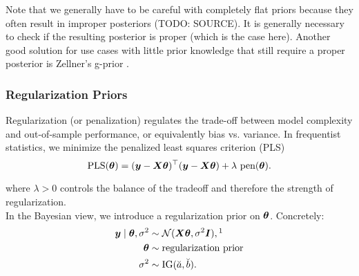 Note that we generally have to be careful with completely flat priors because they often result in improper posteriors (TODO: SOURCE). It is generally necessary to check if the resulting posterior is proper (which is the case here).
Another good solution for use cases with little prior knowledge that still require a proper posterior is Zellner's g-prior \citep{zellner_assessing_1986}.

\subsubsection*{Regularization Priors} \label{sec:lm-regularization}

Regularization (or penalization) regulates the trade-off between model complexity and out-of-sample performance, or equivalently bias vs. variance. 
In frequentist statistics, we minimize the penalized least squares criterion (PLS) 
\begin{equation*}
    \text{PLS}(\btheta) = (\by - \bX \btheta)^\top (\by - \bX \btheta) + \lambda \ \text{pen}(\btheta).
\end{equation*}

where $\lambda > 0$ controls the balance of the tradeoff and therefore the strength of regularization.\\

In the Bayesian view, we introduce a regularization prior on $\bm{\theta}$.
Concretely:
\begin{equation*}
    \begin{aligned}
        \by \mid \btheta, \ssd &\sim \Ncal(\bX \btheta, \ssd \bI),\footnotemark \\
        \btheta &\sim \text{regularization prior}\\
        \ssd &\sim \IG(\apri, \bpri).
    \end{aligned}
\end{equation*}


